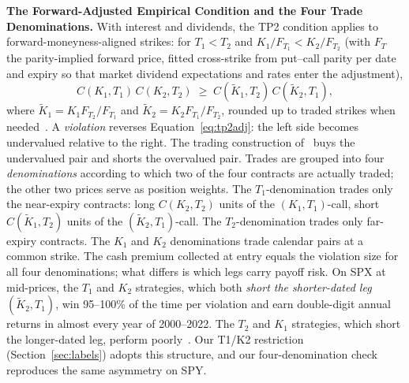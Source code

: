 \documentclass[sigconf,review,anonymous]{acmart}
\begin{document}
\medskip\noindent\textbf{The Forward-Adjusted Empirical Condition and the Four Trade Denominations.}
\label{sec:denominations}
With interest and dividends, the TP2 condition applies to forward-moneyness-aligned strikes: for $T_1<T_2$ and $K_1/F_{T_1}<K_2/F_{T_2}$ (with $F_T$ the parity-implied forward price, fitted cross-strike from put--call parity per date and expiry so that market dividend expectations and rates enter the adjustment),
\begin{equation}
C(K_1,T_1)\,C(K_2,T_2)\;\ge\;C(\tilde K_1,T_2)\,C(\tilde K_2,T_1),
\label{eq:tp2adj}
\end{equation}
where $\tilde K_1=K_1 F_{T_2}/F_{T_1}$ and $\tilde K_2=K_2 F_{T_1}/F_{T_2}$, rounded up to traded strikes when needed~\cite{glasserman2025tp2}. A \emph{violation} reverses Equation~\eqref{eq:tp2adj}: the left side becomes undervalued relative to the right. The trading construction of~\cite{glasserman2025tp2} buys the undervalued pair and shorts the overvalued pair. Trades are grouped into four \emph{denominations} according to which two of the four contracts are actually traded; the other two prices serve as position weights. The $T_1$-denomination trades only the near-expiry contracts: long $C(K_2,T_2)$ units of the $(K_1,T_1)$-call, short $C(\tilde K_1,T_2)$ units of the $(\tilde K_2,T_1)$-call. The $T_2$-denomination trades only far-expiry contracts. The $K_1$ and $K_2$ denominations trade calendar pairs at a common strike. The cash premium collected at entry equals the violation size for all four denominations; what differs is which legs carry payoff risk. On SPX at mid-prices, the $T_1$ and $K_2$ strategies, which both \emph{short the shorter-dated leg} $(\tilde K_2,T_1)$, win 95--100\% of the time per violation and earn double-digit annual returns in almost every year of 2000--2022. The $T_2$ and $K_1$ strategies, which short the longer-dated leg, perform poorly~\cite{glasserman2025tp2}. Our T1/K2 restriction (Section~\ref{sec:labels}) adopts this structure, and our four-denomination check reproduces the same asymmetry on SPY.
\end{document}
